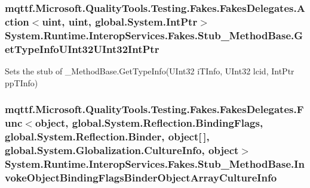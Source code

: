 \hypertarget{class_system_1_1_runtime_1_1_interop_services_1_1_fakes_1_1_stub___method_base_a123d07fc900061a6eacd7ac0edeac04c}{
\subsubsection[{Get\-Type\-Info\-U\-Int32\-U\-Int32\-Int\-Ptr}]{\setlength{\rightskip}{0pt plus 5cm}mqttf.\-Microsoft.\-Quality\-Tools.\-Testing.\-Fakes.\-Fakes\-Delegates.\-Action$<$uint, uint, global.\-System.\-Int\-Ptr$>$ System.\-Runtime.\-Interop\-Services.\-Fakes.\-Stub\-\_\-\-Method\-Base.\-Get\-Type\-Info\-U\-Int32\-U\-Int32\-Int\-Ptr}}\label{class_system_1_1_runtime_1_1_interop_services_1_1_fakes_1_1_stub___method_base_a123d07fc900061a6eacd7ac0edeac04c}


Sets the stub of \-\_\-\-Method\-Base.\-Get\-Type\-Info(\-U\-Int32 i\-T\-Info, U\-Int32 lcid, Int\-Ptr pp\-T\-Info)

\hypertarget{class_system_1_1_runtime_1_1_interop_services_1_1_fakes_1_1_stub___method_base_af1b7c9e72834513a57bb310961629fd4}{
\subsubsection[{Invoke\-Object\-Binding\-Flags\-Binder\-Object\-Array\-Culture\-Info}]{\setlength{\rightskip}{0pt plus 5cm}mqttf.\-Microsoft.\-Quality\-Tools.\-Testing.\-Fakes.\-Fakes\-Delegates.\-Func$<$object, global.\-System.\-Reflection.\-Binding\-Flags, global.\-System.\-Reflection.\-Binder, object\mbox{[}$\,$\mbox{]}, global.\-System.\-Globalization.\-Culture\-Info, object$>$ System.\-Runtime.\-Interop\-Services.\-Fakes.\-Stub\-\_\-\-Method\-Base.\-Invoke\-Object\-Binding\-Flags\-Binder\-Object\-Array\-Culture\-Info}}\label{class_system_1_1_runtime_1_1_interop_services_1_1_fakes_1_1_stub___method_base_af1b7c9e72834513a57bb310961629fd4}



